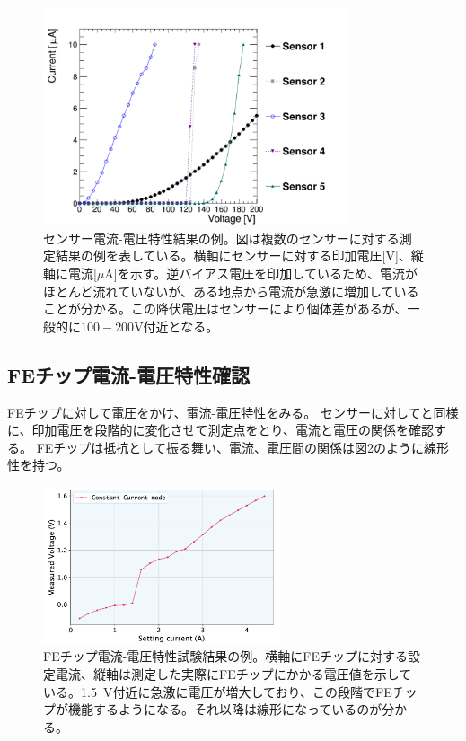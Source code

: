 \begin{figure}[bpt]\centering
\includegraphics[width=9cm]{./sensor_IV_result.pdf}
\caption[センサー電流-電圧特性結果の例]{センサー電流-電圧特性結果の例\cite{3-6}。図は複数のセンサーに対する測定結果の例を表している。横軸にセンサーに対する印加電圧[V]、縦軸に電流[$\mu$A]を示す。逆バイアス電圧を印加しているため、電流がほとんど流れていないが、ある地点から電流が急激に増加していることが分かる。この降伏電圧はセンサーにより個体差があるが、一般的に$100-200$V付近となる。}
\label{sensor_IV_result}
\end{figure}

\subsection{FEチップ電流-電圧特性確認}
FEチップに対して電圧をかけ、電流-電圧特性をみる。
センサーに対してと同様に、印加電圧を段階的に変化させて測定点をとり、電流と電圧の関係を確認する。
FEチップは抵抗として振る舞い、電流、電圧間の関係は図\ref{SLDO_VI_result}のように線形性を持つ。

\begin{figure}[bpt]\centering
\includegraphics[width=7cm]{./SLDO_VI_result.png}
\caption[FEチップ電流-電圧特性試験結果の例。]{FEチップ電流-電圧特性試験結果の例\cite{3-4}。横軸にFEチップに対する設定電流、縦軸は測定した実際にFEチップにかかる電圧値を示している。1.5~V付近に急激に電圧が増大しており、この段階でFEチップが機能するようになる。それ以降は線形になっているのが分かる。}
\label{SLDO_VI_result}
\end{figure}

